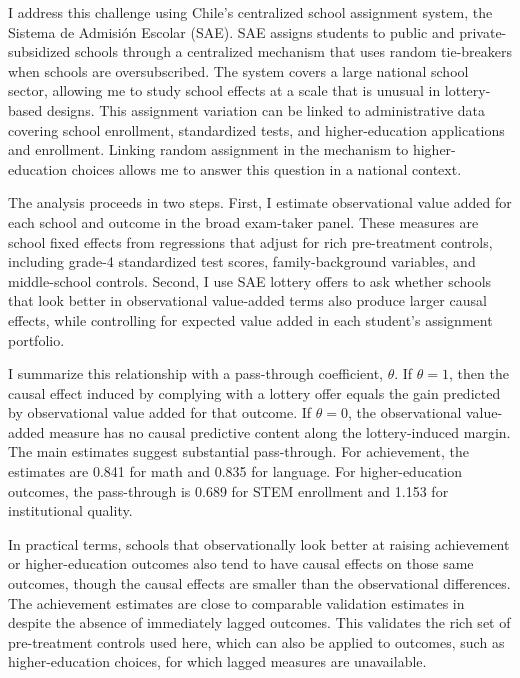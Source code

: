 \documentclass[a4paper, article, english, oneside, unknownkeysallowed, 12pt]{memoir}
\begin{document}
I address this challenge using Chile's centralized school assignment system, the Sistema de Admisi\'on Escolar (SAE).
SAE assigns students to public and private-subsidized schools through a centralized mechanism that uses random tie-breakers when schools are oversubscribed.
The system covers a large national school sector, allowing me to study school effects at a scale that is unusual in lottery-based designs.
This assignment variation can be linked to administrative data covering school enrollment, standardized tests, and higher-education applications and enrollment.
Linking random assignment in the mechanism to higher-education choices allows me to answer this question in a national context.


The analysis proceeds in two steps.
First, I estimate observational value added for each school and outcome in the broad exam-taker panel.
These measures are school fixed effects from regressions that adjust for rich pre-treatment controls, including grade-4 standardized test scores, family-background variables, and middle-school controls.
Second, I use SAE lottery offers to ask whether schools that look better in observational value-added terms also produce larger causal effects, while controlling for expected value added in each student's assignment portfolio.


I summarize this relationship with a pass-through coefficient, $\theta$.
If $\theta=1$, then the causal effect induced by complying with a lottery offer equals the gain predicted by observational value added for that outcome.
If $\theta=0$, the observational value-added measure has no causal predictive content along the lottery-induced margin.
The main estimates suggest substantial pass-through.
For achievement, the estimates are 0.841 for math and 0.835 for language.
For higher-education outcomes, the pass-through is 0.689 for STEM enrollment and 1.153 for institutional quality.

In practical terms, schools that observationally look better at raising achievement or higher-education outcomes also tend to have causal effects on those same outcomes, though the causal effects are smaller than the observational differences.
The achievement estimates are close to comparable validation estimates in \textcite{angrist_leveraging_2017} despite the absence of immediately lagged outcomes.
This validates the rich set of pre-treatment controls used here, which can also be applied to outcomes, such as higher-education choices, for which lagged measures are unavailable.
\end{document}
